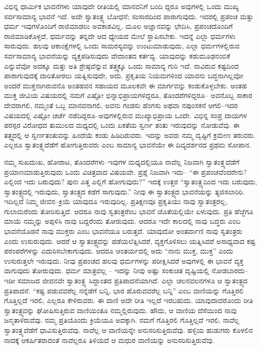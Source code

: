 ವಿಭಿನ್ನ ಧಾರ್ಮಿಕ ಭಾವನೆಗಳು ಯಾವುದೇ ರೀತಿಯಲ್ಲಿ ಮಾನವನಿಗೆ ಬಂದಿ ದ್ದರೂ ಅವುಗಳಲ್ಲಿ ಒಂದು ಮುಖ್ಯ ಸರ್ವಸಾಮಾನ್ಯ ಭಾವನೆ ಇದೆ. ಅದೇ ಸ್ವಾತಂತ್ರ್ಯ ಬೋಧನೆ; ಸಂಸಾರದಿಂದ ಪಾರಾಗುವುದು. ಇದರಲ್ಲಿ ಪ್ರಪಂಚ ಮತ್ತು ಧರ್ಮ ಇವುಗಳೊಂದಿಗೆ ರಾಜಿಮಾಡಲು ಅವಕಾಶವಿಲ್ಲ. ಮೂಲ ಅಜ್ಞಾನವನ್ನು ಛೇದಿಸಿ, ಪ್ರಪಂಚದೊಂದಿಗೆ ರಾಜಿಮಾಡಿಕೊಳ್ಳದೆ, ಧರ್ಮವನ್ನು ತನ್ನದೇ ಆದ ಧ್ಯೇಯದ ಮೇಲೆ ಸ್ಥಾಪಿಸಬೇಕು. ಇದನ್ನೆ ಎಲ್ಲಾ ಧರ್ಮಗಳು ಸಾರುವುದು. ಹಲವು ಆಕಾಂಕ್ಷೆಗಳಲ್ಲಿ ಒಂದು ಸಾಮರಸ್ಯವನ್ನು ಉಂಟುಮಾಡುವುದು, ಎಲ್ಲಾ ಧರ್ಮಗಳಲ್ಲಿರುವ ಸರ್ವಸಾಮಾನ್ಯ ಭಾವನೆಯನ್ನು ವ್ಯಕ್ತಪಡಿಸುವುದು ವೇದಾಂತದ ಕರ್ತವ್ಯ. ಯಾವುದನ್ನು ಕಡುಮೂಢನಂಬಿಕೆ ಎನ್ನುವೆವೋ ಅದಕ್ಕೂ ಮತ್ತು ಅತಿ ಶ್ರೇಷ್ಠವೆನ್ನುವ ತತ್ತ್ವಕ್ಕೂ ಒಂದು ಸಾಮಾನ್ಯ ಗುರಿ ಇದೆ. ನಾವಿರುವ ಕಷ್ಟದಿಂದ ಪಾರಾಗುವುದಕ್ಕೆ ದಾರಿತೋರಲು ಯತ್ನಿಸುವುದೇ, ಅದು. ಪ್ರಕೃತಿಯ ನಿಯಮಗಳಿಂದ ಯಾವನು ಬದ್ಧನಾಗಿಲ್ಲವೋ ಅಂದರೆ ಮುಕ್ತನಾಗಿರುವನೊ ಅಂತಹವನ ಸಹಾಯದ ಮೂಲಕವೇ ಈ ಮಾರ್ಗವನ್ನು ಕಂಡುಕೊಳ್ಳಬೇಕು. ಅಂತಹ ಮುಕ್ತ ಜೀವಿಯ ವಿಷಯದಲ್ಲಿ ನಮಗೆ ಎಷ್ಟೋ ಭಿನ್ನಾಭಿಪ್ರಾಯಗಳಿದ್ದರೂ, ತೊಂದರೆಗಳಿದ್ದರೂ– ಅವನೊಬ್ಬ ಸಾಕಾರ ದೇವರಾಗಲಿ, ನಮ್ಮಂತೆ ಒಬ್ಬ ಮಾನವನಾಗಲಿ, ಅವನು ಗಂಡಸು ಹೆಂಗಸು ಅಥವಾ ನಪುಂಸಕನೆ ಆಗಲಿ–ಇದರ ವಿಷಯದಲ್ಲಿ ಎಷ್ಟೋ ಚರ್ಚೆ ನಡೆದಿದ್ದರೂ–ಅವುಗಳಲ್ಲಿರುವ ಮುಖ್ಯಾಭಿಪ್ರಾಯ ಒಂದೇ. ವಿಭಿನ್ನ ಸಂಪ್ರ ದಾಯಗಳ ಪರಸ್ಪರ ವಿರೋಧದ ತುಮುಲದ ಮಧ್ಯದಲ್ಲಿ ಒಂದು ಏಕತೆಯ ಸ್ವರ್ಣ ತಂತು ಇರುವುದನ್ನು ನೋಡುವೆವು. ಈ ತತ್ತ್ವದಲ್ಲಿ ಆ ಸ್ವರ್ಣತಂತುವನ್ನು ಹಿಂದೆಯೆ ಕಂಡು ಹಿಡಿದಿರುವರು. ಇದನ್ನು ಅವರು ನಮ್ಮ ದೃಷ್ಟಿಗೆ ಕ್ರಮೇಣ ತರುವರು. ಎಲ್ಲರೂ ಸ್ವಾತಂತ್ರ್ಯದೆಡೆಗೆ ಹೋಗುತ್ತಿರುವರು ಎಂಬ ಸಾಮಾನ್ಯ ಭಾವನೆಯೇ ಈ ದಿವ್ಯದರ್ಶನದ ಪ್ರಥಮ ಸೋಪಾನ.

ನಮ್ಮ ಸುಖದುಃಖ, ಹೋರಾಟ, ತೊಂದರೆಗಳು–ಇವುಗಳ ಮಧ್ಯದಲ್ಲಿಯೂ ನಾವೆಲ್ಲ ನಿಜವಾಗಿ ಸ್ವಾತಂತ್ರ್ಯದೆಡೆಗೆ ಪ್ರಯಾಣಮಾಡುತ್ತಿರುವುದು ಒಂದು ವಿಚಿತ್ರವಾದ ವಿಷಯವೇ. ಪ್ರಶ್ನೆ ನಿಜವಾಗಿ ಇದು– “ಈ ಪ್ರಪಂಚವೆಂದರೇನು? ಎಲ್ಲಿಂದ ಇದು ಬರುವುದು? ಪುನಃ ಎತ್ತ ಎಲ್ಲಿಗೆ ಹೋಗುವುದು?” ಇದಕ್ಕೆ ಉತ್ತರ “ಸ್ವಾತಂತ್ರ್ಯದಿಂದ ಇದು ಬರುವುದು, ಸ್ವಾತಂತ್ರ್ಯದಲ್ಲಿ ಇರುವುದು, ಸ್ವಾತಂತ್ರ್ಯದ ಕಡೆಗೆ ಸಾಗುವುದು.” ನೀವು ಈ ಸ್ವಾತಂತ್ರ್ಯದ ಭಾವನೆಯನ್ನು ತ್ಯಜಿಸಲಾರಿರಿ. ಇದಿಲ್ಲದೆ ನಿಮ್ಮ ಜೀವನ–ಕ್ರಿಯೆ ಯಾವುದೂ ಇರುವುದಿಲ್ಲ. ಪ್ರತಿಕ್ಷಣವೂ ಪ್ರಕೃತಿಯು ನಾವು ಸ್ವಾತಂತ್ರರಲ್ಲ, ಗುಲಾಮರೆಂದು ತೋರಿಸುತ್ತಿದೆ. ಆದರೂ ನಾವು ಸ್ವತಂತ್ರರೆಂಬ ಭಾವನೆ ಜೊತೆಯಲ್ಲಿಯೇ ಏಳುವುದು. ಪ್ರತಿ ಹೆಜ್ಜೆಗೂ ಮಾಯೆ ನಮ್ಮನ್ನು ಅಪ್ಪಳಿಸಿ ನಾವು ಬದ್ದರೆಂದು ತೋರುವುದು. ಆದರೂ ಇದೇ ಕಾಲದಲ್ಲಿ ನಾವು ಬದ್ಧರು ಎಂಬ ಭಾವನೆಯೊಡನೆ ನಾವು ಮುಕ್ತರು ಎಂಬ ಭಾವನೆಯೂ ಬರುತ್ತದೆ. ಯಾವುದೋ ಅಂತರ್ವಾಣಿ ನಾವು ಸ್ವತಂತ್ರರು ಎಂದು ಉಸುರುವುದು. ಆದರೆ ಆ ಸ್ವಾತಂತ್ರ್ಯವನ್ನು ಪಡೆಯಲೆತ್ನಿಸಿದರೆ, ವ್ಯಕ್ತಗೊಳಿಸಲು ಯತ್ನಿಸಿದರೆ ಅಸಾಧ್ಯವಾದ ಕಷ್ಟ ಪರಂಪರೆಗಳನ್ನು ಎದುರಿಸಬೇಕಾಗುವುದು. ಆದರೂ ಆಂತರ್ಯದಲ್ಲಿ ಅದು “ನಾನು ಮುಕ್ತ, ಮುಕ್ತ” ಎಂದು ಉಸುರುತ್ತಲೇ ಇರುವುದು. ನೀವು ಪ್ರಪಂಚದ ಹಲವು ಧರ್ಮಗಳನ್ನು ಪರೀಕ್ಷಿಸಿದರೆ ಅವುಗಳಲ್ಲಿ ಈ ಭಾವನೆ ವ್ಯಕ್ತ ವಾಗುವುದು ತೋರುವುದು. ಧರ್ಮ ಮಾತ್ರವಲ್ಲ – ಇದನ್ನು ನೀವು ಅಷ್ಟು ಸಂಕುಚಿತ ದೃಷ್ಟಿಯಲ್ಲಿ ನೋಡಬಾರದು–ಇಡೀ ಸಮಾಜದ ಜೀವನವೇ ಸ್ವಾತಂತ್ರ್ಯ ಸಿದ್ಧಾಂತದ ಪ್ರತಿಪಾದನೆಯಾಗಿದೆ. ಎಲ್ಲಾ ಚಲನವಲನಗಳೂ ಆ ಸ್ವಾತಂತ್ರ್ಯದ ಪ್ರತಿಪಾದನೆ. “ಕಷ್ಟ ಪಡುವವರೆಲ್ಲ ನನ್ನೆಡೆಗೆ ಬನ್ನಿ, ಭಾರ ಹೊರುವವರೆಲ್ಲ ಬನ್ನಿ” ಎಂಬ ವಾಣಿಯನ್ನು ಗೊತ್ತಿರಲಿ ಗೊತ್ತಿಲ್ಲದೆ ಇರಲಿ, ಎಲ್ಲರೂ ಕೇಳಿರುವರು. ಈ ವಾಣಿ ಅದೇ ರೀತಿ ಇಲ್ಲದೆ ಇರಬಹುದು. ಯಾವುದಾದರೊಂದು ರೀತಿ ಸ್ವಾತಂತ್ರ್ಯವನ್ನು ಘೋಷಿಸುತ್ತಿರುವ ವಾಣಿಯಂತೂ ನಮ್ಮಲ್ಲಿರುವುದು. ಹೌದು, ಆ ವಾಣಿಯ ದೆಸೆಯಿಂದ ನಾವು ಜನ್ಮತಾಳಿರುವೆವು. ನಮ್ಮ ಪ್ರತಿಯೊಂದು ಕ್ರಿಯೆಯೂ ಅದಕ್ಕಾಗಿ. ನಮಗೆ ಗೊತ್ತಿರಲಿ ಗೊತ್ತಿಲ್ಲದೆ ಇರಲಿ, ನಾವೆಲ್ಲ ಸ್ವಾತಂತ್ರ್ಯದೆಡೆಗೆ ಧಾವಿಸುತ್ತಿರುವೆವು. ನಾವೆಲ್ಲ ಆ ವಾಣಿಯನ್ನೇ ಅನುಸರಿಸುತ್ತಿರುವೆವು. ಹಳ್ಳಿಯ ಹುಡುಗರು ಕೊಳಲಿನ ನಾದಕ್ಕೆ ಆಕರ್ಷಿತರಾದಂತೆ ನಾವೆಲ್ಲರೂ ತಿಳಿಯದೆ ಆ ಮಧುರ ವಾಣಿಯನ್ನು ಅನುಸರಿಸುತ್ತಿರುವೆವು.

